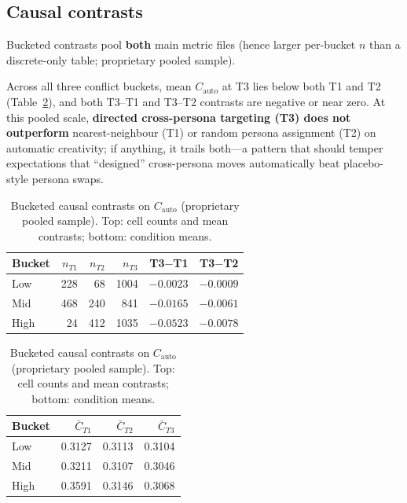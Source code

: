 \documentclass[sigconf,nonacm]{acmart}
\begin{document}
\subsection{Causal contrasts}

Bucketed contrasts pool \textbf{both} main metric files (hence larger per-bucket $n$ than a discrete-only table; proprietary pooled sample).

Across all three conflict buckets, mean $C_{\mathrm{auto}}$ at T3 lies below both T1 and T2 (Table~\ref{tab:causal}), and both T3--T1 and T3--T2 contrasts are negative or near zero. At this pooled scale, \textbf{directed cross-persona targeting (T3) does not outperform} nearest-neighbour (T1) or random persona assignment (T2) on automatic creativity; if anything, it trails both---a pattern that should temper expectations that ``designed'' cross-persona moves automatically beat placebo-style persona swaps.

\begin{table}[t]
\centering
\footnotesize
\setlength{\tabcolsep}{4pt}
\begin{tabular}{@{}lrrrrr@{}}
\toprule
Bucket & $n_{T1}$ & $n_{T2}$ & $n_{T3}$ & T3$-$T1 & T3$-$T2 \\
\midrule
Low  & 228 &  68 & 1004 & $-0.0023$ & $-0.0009$ \\
Mid  & 468 & 240 &  841 & $-0.0165$ & $-0.0061$ \\
High &  24 & 412 & 1035 & $-0.0523$ & $-0.0078$ \\
\bottomrule
\end{tabular}
\par\medskip
\begin{tabular}{@{}lrrr@{}}
\toprule
Bucket & $\bar{C}_{T1}$ & $\bar{C}_{T2}$ & $\bar{C}_{T3}$ \\
\midrule
Low  & 0.3127 & 0.3113 & 0.3104 \\
Mid  & 0.3211 & 0.3107 & 0.3046 \\
High & 0.3591 & 0.3146 & 0.3068 \\
\bottomrule
\end{tabular}
\caption{Bucketed causal contrasts on $C_{\mathrm{auto}}$ (proprietary pooled sample). Top: cell counts and mean contrasts; bottom: condition means.}
\label{tab:causal}
\end{table}
\end{document}
